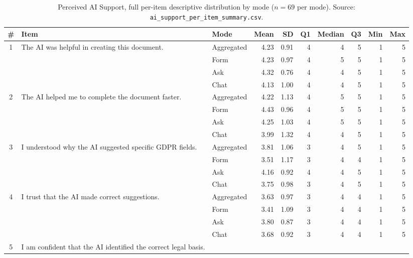 \begin{table}
\centering
\caption{Perceived AI Support, full per-item descriptive
distribution by mode ($n = 69$ per mode). Source:
\texttt{ai\_support\_per\_item\_summary.csv}.}
\label{tab:ai-per-item-distribution}
\small
\begin{tabularx}{\linewidth}{@{}c X l r r r r r r r@{}}
\toprule
\# & Item & Mode & Mean & SD & Q1 & Median & Q3 & Min & Max \\
\midrule
\multirow{4}{*}{1} & \multirow{4}{*}{The AI was helpful in creating this document.}
                   & Aggregated  & 4.23 & 0.91 & 4 & 4 & 5 & 1 & 5 \\
                   & & Form & 4.23 & 0.97 & 4 & 5 & 5 & 1 & 5 \\
                   & & Ask  & 4.32 & 0.76 & 4 & 4 & 5 & 1 & 5 \\
                   & & Chat & 4.13 & 1.00 & 4 & 4 & 5 & 1 & 5 \\
\midrule
\multirow{4}{*}{2} & \multirow{4}{*}{The AI helped me to complete the document faster.}
                   & Aggregated  & 4.22 & 1.13 & 4 & 5 & 5 & 1 & 5 \\
                   & & Form & 4.43 & 0.96 & 4 & 5 & 5 & 1 & 5 \\
                   & & Ask  & 4.25 & 1.03 & 4 & 5 & 5 & 1 & 5 \\
                   & & Chat & 3.99 & 1.32 & 4 & 4 & 5 & 1 & 5 \\
\midrule
\multirow{4}{*}{3} & \multirow{4}{*}{I understood why the AI suggested specific GDPR fields.}
                   & Aggregated  & 3.81 & 1.06 & 3 & 4 & 5 & 1 & 5 \\
                   & & Form & 3.51 & 1.17 & 3 & 4 & 4 & 1 & 5 \\
                   & & Ask  & 4.16 & 0.92 & 4 & 4 & 5 & 1 & 5 \\
                   & & Chat & 3.75 & 0.98 & 3 & 4 & 5 & 1 & 5 \\
\midrule
\multirow{4}{*}{4} & \multirow{4}{*}{I trust that the AI made correct suggestions.}
                   & Aggregated  & 3.63 & 0.97 & 3 & 4 & 4 & 1 & 5 \\
                   & & Form & 3.41 & 1.09 & 3 & 4 & 4 & 1 & 5 \\
                   & & Ask  & 3.80 & 0.87 & 3 & 4 & 4 & 1 & 5 \\
                   & & Chat & 3.68 & 0.92 & 3 & 4 & 4 & 1 & 5 \\
\midrule
\multirow{4}{*}{5} & \multirow{4}{*}{I am confident that the AI identified the correct legal basis.}

\end{tabularx}
\end{table}
